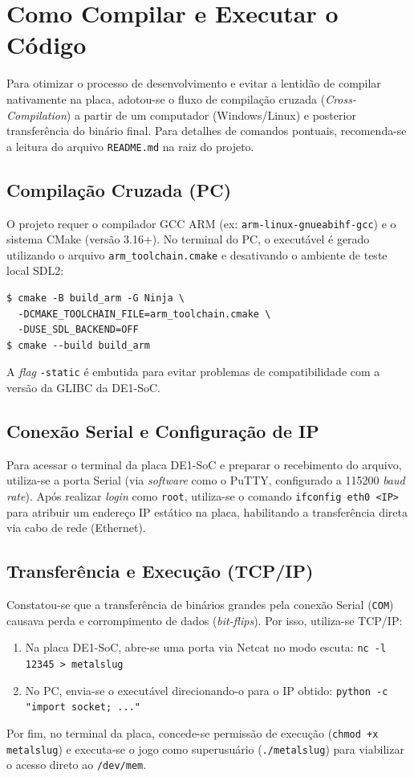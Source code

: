 \documentclass[10pt,twocolumn,letterpaper]{article}
\begin{document}
\section{Como Compilar e Executar o Código}
Para otimizar o processo de desenvolvimento e evitar a lentidão de compilar nativamente na placa, adotou-se o fluxo de compilação cruzada (\textit{Cross-Compilation}) a partir de um computador (Windows/Linux) e posterior transferência do binário final. Para detalhes de comandos pontuais, recomenda-se a leitura do arquivo \texttt{README.md} na raiz do projeto.

\subsection{Compilação Cruzada (PC)}
O projeto requer o compilador GCC ARM (ex: \texttt{arm-linux-gnueabihf-gcc}) e o sistema CMake (versão 3.16+). No terminal do PC, o executável é gerado utilizando o arquivo \texttt{arm\_toolchain.cmake} e desativando o ambiente de teste local SDL2:
{\scriptsize
\begin{verbatim}
$ cmake -B build_arm -G Ninja \
  -DCMAKE_TOOLCHAIN_FILE=arm_toolchain.cmake \
  -DUSE_SDL_BACKEND=OFF
$ cmake --build build_arm
\end{verbatim}
}
A \textit{flag} \texttt{-static} é embutida para evitar problemas de compatibilidade com a versão da GLIBC da DE1-SoC.

\subsection{Conexão Serial e Configuração de IP}
Para acessar o terminal da placa DE1-SoC e preparar o recebimento do arquivo, utiliza-se a porta Serial (via \textit{software} como o PuTTY, configurado a 115200 \textit{baud rate}). Após realizar \textit{login} como \texttt{root}, utiliza-se o comando \texttt{ifconfig eth0 <IP>} para atribuir um endereço IP estático na placa, habilitando a transferência direta via cabo de rede (Ethernet).

\subsection{Transferência e Execução (TCP/IP)}
Constatou-se que a transferência de binários grandes pela conexão Serial (\texttt{COM}) causava perda e corrompimento de dados (\textit{bit-flips}). Por isso, utiliza-se TCP/IP:
\begin{enumerate}
    \item Na placa DE1-SoC, abre-se uma porta via Netcat no modo escuta: \texttt{nc -l 12345 > metalslug}
    \item No PC, envia-se o executável direcionando-o para o IP obtido: \texttt{python -c "import socket; ..."}
\end{enumerate}
Por fim, no terminal da placa, concede-se permissão de execução (\texttt{chmod +x metalslug}) e executa-se o jogo como superusuário (\texttt{./metalslug}) para viabilizar o acesso direto ao \texttt{/dev/mem}.
\end{document}
